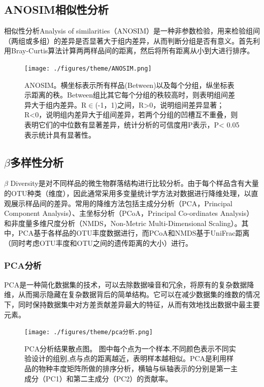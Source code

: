 \documentclass[a4paper,10pt]{article}
\numberwithin{figure}{section}
\numberwithin{table}{section}
\begin{document}
\newpage

\subsection{ANOSIM相似性分析}
\label{Subsec: ANOSIM}
相似性分析Analysis of similarities（ANOSIM）是一种非参数检验，用来检验组间（两组或多组）的差异是否显著大于组内差异，从而判断分组是否有意义。首先利用Bray-Curtis算法计算两两样品间的距离，然后将所有距离从小到大进行排序。
\begin{figure}[H]
\centering
\captionsetup{width=.8\textwidth,singlelinecheck = false, justification=justified}
\label{Fig:ANOSIM}
\captionsetup{width=.8\textwidth,singlelinecheck = false, justification=justified}
 \texttt{[image: ./figures/theme/ANOSIM.png]}  
   \caption{ANOSIM。横坐标表示所有样品(Between)以及每个分组，纵坐标表示距离的秩。Between组比其它每个分组的秩较高时，则表明组间差异大于组内差异。R$\in$(-1，1)之间，R>0，说明组间差异显著；R<0，说明组内差异大于组间差异，若两个分组的凹槽互不重叠，则表明它们的中位数有显著差异，统计分析的可信度用P表示，P< 0.05表示统计具有显著性。}
\end{figure}

\newpage

\subsection{$\beta$多样性分析}
\label{Subsec: betaadiverstiy}
$\beta$ Diversity是对不同样品的微生物群落结构进行比较分析。由于每个样品含有大量的OTU种类（维度），因此通常采用多变量统计学方法对数据进行降维处理，以直观展示样品间的差异。常用的降维方法包括主成分分析（PCA，Principal Component Analysis）、主坐标分析（PCoA，Principal Co-ordinates Analysis）和非度量多维尺度分析（NMDS，Non-Metric Multi-Dimensional Scaling）。其中，PCA基于各样品的OTU丰度数据进行，而PCoA和NMDS基于UniFrac距离（同时考虑OTU丰度和OTU之间的遗传距离的大小）进行。
\subsubsection{PCA分析}
\label{Subsubsec：PCA}
PCA是一种简化数据集的技术，可以去除数据噪音和冗余，将原有的复杂数据降维，从而揭示隐藏在复杂数据背后的简单结构。它可以在减少数据集的维数的情况下，同时保持数据集中对方差贡献差异最大的特征，从而有效地找出数据中最主要元素。
\begin{figure}[H]
\centering
\label{Fig:PCA}
\captionsetup{width=.8\textwidth,singlelinecheck = false, justification=justified}
 \texttt{[image: ./figures/theme/pca分析.png]}  
   \caption{PCA分析结果散点图。 图中每个点为一个样本,不同颜色表示不同实验设计的组别,点与点的距离越近，表明样本越相似。PCA是利用样品的物种丰度矩阵所做的排序分析，横轴与纵轴表示的分别是第一主成分（PC1）和第二主成分（PC2）的贡献率。}
\end{figure}
\newpage
\end{document}
